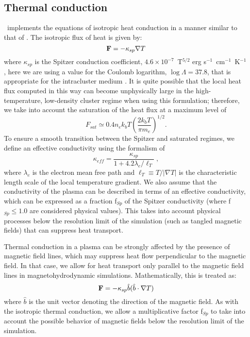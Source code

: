 \subsection{Thermal conduction}
\label{sec.num.conductions}

\enzo\ implements the equations of isotropic heat conduction in a manner
similar to that of \citet{2007ApJ...664..135P}.  
The isotropic flux of heat is given by:
\begin{equation}
\myvec{F} = -\kappa_{sp} \nabla T
\end{equation}
where $\kappa_{sp}$ is the Spitzer conduction coefficient, $4.6 \times 10^{-7}$~T$^{5/2}$ erg
s$^{-1}$~cm$^{-1}$~K$^{-1}$ \citep{1962pfig.book.....S}, here we are using a
value for the Coulomb logarithm, $\log \Lambda = 37.8$, that is
appropriate for the intracluster medium \citep{1988xrec.book.....S}.
It is quite possible that the local heat flux computed in this way 
can become unphysically large in
the high-temperature, low-density cluster regime when using this
formulation; therefore, we take into account the saturation of the heat
flux \citep{1977ApJ...211..135C} at a maximum level of
\begin{equation}
F_{sat} \simeq 0.4 n_e k_b T \left( \frac{2 k_b T}{\pi m_e} \right)^{1/2}.
\end{equation}
To ensure a smooth transition between
the Spitzer and saturated regimes, we define an effective
conductivity using the formalism of \citet{1988xrec.book.....S}
\begin{equation}
\kappa_{eff} = \frac{\kappa_{sp}}{1 + 4.2 \lambda_e / \ell_T} \; ,
\end{equation}
where $\lambda_e$ is the electron mean free path and $\ell_T \equiv T
/ |\nabla T|$ is the characteristic length scale of the local
temperature gradient.  We also assume that the conductivity of the
plasma can be described in terms of an effective conductivity, which
can be expressed as a fraction f$_{Sp}$ of the Spitzer conductivity
(where f$_{Sp} \leq 1.0$ are considered physical values).  This takes
into account physical processes below the resolution limit of the
simulation (such as tangled magnetic fields) that can suppress heat
transport.

Thermal conduction in a plasma can be strongly affected by the
presence of magnetic field lines, which may suppress heat
flow perpendicular to the magnetic field.  In that case, we allow for
heat transport only parallel to the magnetic field lines in
magnetohydrodynamic simulations.  Mathematically, this is treated as:
\begin{equation}
\myvec{F} = -\kappa_{sp} \hat{b} (\hat{b} \cdot \nabla T)
\end{equation}
where $\hat{b}$ is the unit vector denoting the direction of the
magnetic field.  As with the isotropic thermal conduction, we allow a
multiplicative factor f$_{Sp}$ to take into account the possible
behavior of magnetic fields below the resolution limit of the
simulation.

